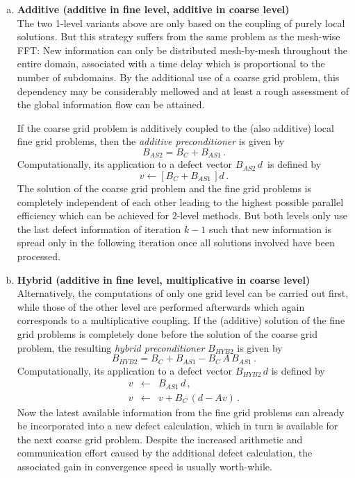 \begin{enumerate}[(a)]
\item{{\bf Additive \tls{} (additive in fine level, additive in coarse level)}}\\[0.5ex]
The two 1-level variants above are only based on the coupling of purely local solutions. But this strategy suffers from the same problem as the mesh-wise FFT: New information can only be distributed mesh-by-mesh throughout the entire domain, associated with a time delay which is proportional to the number of subdomains. 
By the additional use of a coarse grid problem, this dependency may be considerably mellowed and at least a rough assessment of the global information flow can be attained. 

If the coarse grid problem is additively coupled to the (also additive) local fine grid problems, then the {\it additive \tls{} preconditioner}  is given by
\[B_{AS2} = B_C + B_{AS1}  \,. \]
Computationally, its application to a defect vector $B_{AS2} \,d\,$ is defined by
\[  v \leftarrow  \left[B_C +  B_{AS1}\,\right] d \,. \]
The solution of the coarse grid problem and the fine grid problems is completely independent of each other leading to the highest possible parallel efficiency which can be achieved for 2-level methods. But both levels only use the last defect information of iteration $k-1$ such that new information is spread only in the following iteration once all solutions involved have been processed.

\item{{\bf Hybrid \tls{} (additive in fine level, multiplicative in coarse level)}}\\[0.5ex]
Alternatively, the computations of only one grid level can be carried out first, while those of the other level are performed afterwards which again corresponds to a multiplicative coupling. If the (additive) solution of the fine grid problems is completely done before the solution of the coarse grid problem, the resulting
{\it hybrid \tls{} preconditioner} $B_{HYB2}$ is given by
\[B_{HYB2} = B_C +  B_{AS1} - B_C \,A\, B_{AS1}\,. \] 
Computationally, its application to a defect vector $B_{HYB2}\, d$ is defined by 
\begin{eqnarray*}
v & \leftarrow & B_{AS1}\, d                            \,, \\
v & \leftarrow & v + B_C \, (d - Av)\,. 
\end{eqnarray*}
Now the latest available information from the fine grid problems can already be incorporated into a new defect calculation, which in turn is available for the next coarse grid problem. 
Despite the increased arithmetic and communication effort caused by the additional defect calculation, the associated gain in convergence speed is usually worth-while.

\end{enumerate}

